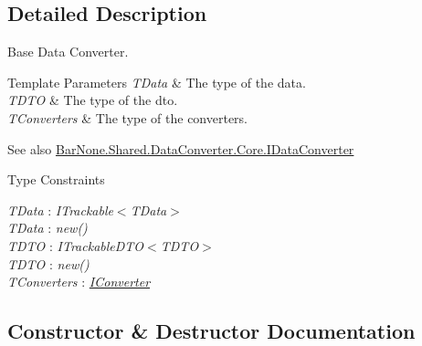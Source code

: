 \subsection{Detailed Description}
Base Data Converter. 


\begin{DoxyTemplParams}{Template Parameters}
{\em T\+Data} & The type of the data.\\
\hline
{\em T\+D\+TO} & The type of the dto.\\
\hline
{\em T\+Converters} & The type of the converters.\\
\hline
\end{DoxyTemplParams}
\begin{DoxySeeAlso}{See also}
\mbox{\hyperlink{interface_bar_none_1_1_shared_1_1_data_converter_1_1_core_1_1_i_data_converter}{Bar\+None.\+Shared.\+Data\+Converter.\+Core.\+I\+Data\+Converter}}


\end{DoxySeeAlso}
\begin{Desc}
\item[Type Constraints]\begin{description}
\item[{\em T\+Data} : {\em I\+Trackable$<$T\+Data$>$}]\item[{\em T\+Data} : {\em new()}]\item[{\em T\+D\+TO} : {\em I\+Trackable\+D\+TO$<$T\+D\+TO$>$}]\item[{\em T\+D\+TO} : {\em new()}]\item[{\em T\+Converters} : {\em \mbox{\hyperlink{interface_bar_none_1_1_shared_1_1_data_converter_1_1_core_1_1_i_converter}{I\+Converter}}}]\end{description}
\end{Desc}


\subsection{Constructor \& Destructor Documentation}
\mbox{\label{class_bar_none_1_1_shared_1_1_data_converter_1_1_core_1_1_base_data_converter_a8c324ead3d3b0d42f816050dbbd42f36}} 
